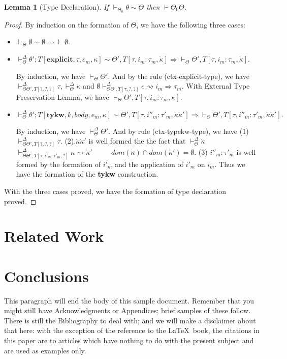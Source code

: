 \documentclass{sig-alternate}
\newcommand{\myvdash}{\vdash_{\Theta}^{\Delta}}
\newtheorem{lemma}{Lemma}
\begin{document}
\begin{lemma}[Type Declaration]
If $\vdash_{\Theta_0}\theta\sim\Theta$ then $\vdash\Theta_0\Theta$.
\end{lemma}
\begin{proof}
By induction on the formation of $\Theta$, we have the following three cases:
\begin{itemize}
\item $\vdash_{\Theta}\emptyset\sim\emptyset \Longrightarrow \vdash{\emptyset}$.
\item ${\vdash^{\Delta}_{\Theta}} \theta';T[\mathbf{explicit},\tau,e_m,\kappa] \sim \Theta',T[\tau,i_m:\tau_m,\dot\kappa] \Longrightarrow \vdash_{\Theta}\Theta',T[\tau,i_m:\tau_m,\dot{\kappa}]$. 

By induction, we have $\vdash_{\Theta}\Theta'$. And by the rule (ctx-explicit-type), we have $\vdash_{\Theta\Theta',T[?,?,?]}^{\Delta}\tau, \myvdash\dot\kappa$ and $\emptyset\vdash_{\Theta\Theta',T[\tau,?,?]}^{\Delta}e\rightsquigarrow i_m\Rightarrow\tau_m$. With External Type Preservation Lemma, we have $\vdash_{\Theta}\Theta',T[\tau,i_m:\tau_m,\dot{\kappa}]$.
\item $\myvdash \theta';T[\mathbf{tykw},k,body,e_m,\kappa] \sim \Theta',T[\tau,i''_m:\tau'_m,\dot{\kappa}\dot{\kappa}'] \Longrightarrow \vdash_{\Theta}\Theta',T[\tau,i''_m:\tau'_m,\dot{\kappa}\dot{\kappa}'].$

By induction, we have $\myvdash\Theta'$. And by rule (ctx-typekw-type), we have (1) $\vdash_{\Theta\Theta',T[?,?,?]}^{\Delta}\tau$. (2).$\dot\kappa\dot\kappa'$ is well formed the the fact that $\myvdash \dot\kappa$~~~~ $\vdash^{\Delta}_{\Theta\Theta',T[\tau,i'_m:\tau'_m,?]}\kappa\rightsquigarrow\dot{\kappa}'$ ~~~~ $dom(\dot{\kappa})\cap dom(\dot{\kappa}')=\emptyset$. (3) $i''_m:\tau'_m$ is well formed by the formation of $i'_m$ and the application of $i'_m$ on $i_m$. Thus we have the formation of the \textbf{tykw} construction.
\end{itemize}
With the three cases proved, we have the formation of type declaration proved.
\end{proof}

%

\section{Related Work}\label{related}
\section{Conclusions}
This paragraph will end the body of this sample document.
Remember that you might still have Acknowledgments or
Appendices; brief samples of these
follow.  There is still the Bibliography to deal with; and
we will make a disclaimer about that here: with the exception
of the reference to the \LaTeX\ book, the citations in
this paper are to articles which have nothing to
do with the present subject and are used as
examples only.
\end{document}
